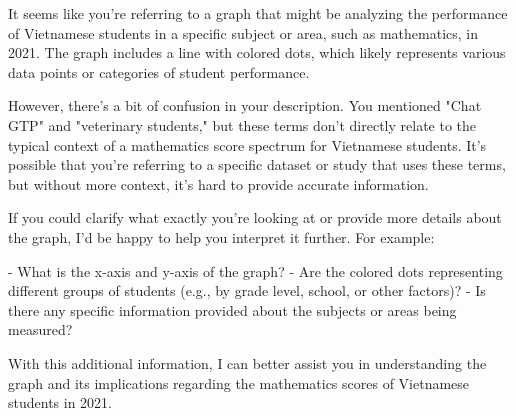 It seems like you're referring to a graph that might be analyzing the performance of Vietnamese students in a specific subject or area, such as mathematics, in 2021. The graph includes a line with colored dots, which likely represents various data points or categories of student performance.

However, there's a bit of confusion in your description. You mentioned "Chat GTP" and "veterinary students," but these terms don't directly relate to the typical context of a mathematics score spectrum for Vietnamese students. It's possible that you're referring to a specific dataset or study that uses these terms, but without more context, it's hard to provide accurate information.

If you could clarify what exactly you're looking at or provide more details about the graph, I'd be happy to help you interpret it further. For example:

- What is the x-axis and y-axis of the graph?
- Are the colored dots representing different groups of students (e.g., by grade level, school, or other factors)?
- Is there any specific information provided about the subjects or areas being measured?

With this additional information, I can better assist you in understanding the graph and its implications regarding the mathematics scores of Vietnamese students in 2021.